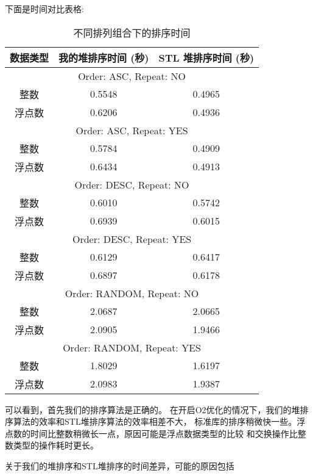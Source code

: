 \documentclass[UTF8]{ctexart}
\begin{document}
下面是时间对比表格:

\begin{table}[H]
    \centering
    \begin{tabular}{|c|c|c|}
        \hline
        数据类型 & 我的堆排序时间 (秒) & STL 堆排序时间 (秒) \\
        \hline
        \multicolumn{3}{|c|}{Order: ASC, Repeat: NO} \\
        \hline
        整数 & 0.5548 & 0.4965 \\
        浮点数 & 0.6206 & 0.4936 \\
        \hline
        \multicolumn{3}{|c|}{Order: ASC, Repeat: YES} \\
        \hline
        整数 & 0.5784 & 0.4909 \\
        浮点数 & 0.6434 & 0.4913 \\
        \hline
        \multicolumn{3}{|c|}{Order: DESC, Repeat: NO} \\
        \hline
        整数 & 0.6010 & 0.5742 \\
        浮点数 & 0.6939 & 0.6015 \\
        \hline
        \multicolumn{3}{|c|}{Order: DESC, Repeat: YES} \\
        \hline
        整数 & 0.6129 & 0.6417 \\
        浮点数 & 0.6897 & 0.6178 \\
        \hline
        \multicolumn{3}{|c|}{Order: RANDOM, Repeat: NO} \\
        \hline
        整数 & 2.0687 & 2.0665 \\
        浮点数 & 2.0905 & 1.9466 \\
        \hline
        \multicolumn{3}{|c|}{Order: RANDOM, Repeat: YES} \\
        \hline
        整数 & 1.8029 & 1.6197 \\
        浮点数 & 2.0983 & 1.9387 \\
        \hline
    \end{tabular}
    \caption{不同排列组合下的排序时间}
    \label{tab:sorting_times}
\end{table}

可以看到，首先我们的排序算法是正确的。
在开启O2优化的情况下，我们的堆排序算法的效率和STL堆排序算法的效率相差不大，
标准库的排序稍微快一些。浮点数的时间比整数稍微长一点，原因可能是浮点数据类型的比较
和交换操作比整数类型的操作耗时更长。

关于我们的堆排序和STL堆排序的时间差异，可能的原因包括
\end{document}
